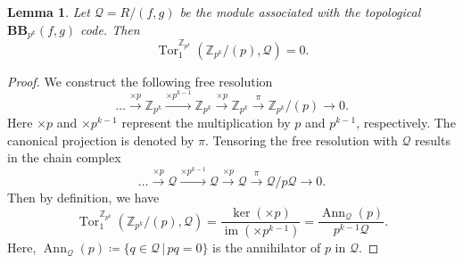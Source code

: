 \documentclass[aps,prb,english,superscriptaddress,twocolumn,tightenlines,showpacs,longbibliography,floatfix,amsfonts]{revtex4-2}
\newcommand{\im}{\operatorname{im}}
\newtheorem{lem}{Lemma}
\begin{document}
\begin{lem}
Let $\mathcal{Q} = R/(f,g)$ be the module associated with the topological $\mathbf{BB}_{p^k}(f,g)$ code. Then
\begin{equation}
    \operatorname{Tor}_1^{\mathbb{Z}_{p^k}}(\mathbb{Z}_{p^k}/(p),\mathcal{Q})=0.
\end{equation}\label{lem:tor2}
\end{lem}
\begin{proof}
    We construct the following free resolution
    \begin{equation}
        \dots\xrightarrow{\times p}\mathbb{Z}_{p^k}\xrightarrow{\times p^{k-1}} \mathbb{Z}_{p^k}\xrightarrow{\times p} \mathbb{Z}_{p^k}\xrightarrow{\pi} \mathbb{Z}_{p^k}/(p)\to 0.
    \end{equation}
    Here $\times p$ and $\times p^{k-1}$ represent the multiplication by $p$ and $p^{k-1}$, respectively. The canonical projection is denoted by $\pi$. Tensoring the free resolution with $\mathcal{Q}$ results in the chain complex
    \begin{equation}
        \dots\xrightarrow{\times p}\mathcal{Q}\xrightarrow{\times p^{k-1}} \mathcal{Q}\xrightarrow{\times p} \mathcal{Q}\xrightarrow{\pi} \mathcal{Q}/p\mathcal{Q}\to 0.
    \end{equation}
    Then by definition, we have
    \begin{equation}
        \operatorname{Tor}_1^{\mathbb{Z}_{p^k}}(\mathbb{Z}_{p^k}/(p),\mathcal{Q})=\frac{\ker(\times p)}{\im (\times p^{k-1})}=\frac{\operatorname{Ann}_{\mathcal{Q}}(p)}{p^{k-1}\mathcal{Q}}.\label{eq:tor1}
    \end{equation}
    Here, $\operatorname{Ann}_{\mathcal{Q}}(p)\coloneqq\{q\in \mathcal{Q}\,|\,pq=0\}$ is the annihilator of $p$ in $\mathcal{Q}$.
      

\end{proof}
\end{document}
